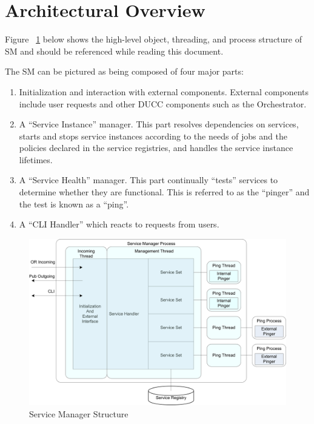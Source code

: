 \section{Architectural Overview}

    Figure ~\ref{fig:sm-structure} below shows the high-level object,
    threading, and process structure of SM and should be referenced
    while reading this document.
    
    The SM can be pictured as being composed of four major parts:
    \begin{enumerate}
      \item Initialization and interaction with external components.
        External components include user requests and  other DUCC components such as
        the Orchestrator.
      \item A ``Service Instance'' manager.  This part resolves
        dependencies on services, starts and stops service instances
        according to the needs of jobs and the policies declared in
        the service registries, and handles the service instance
        lifetimes.
      \item A ``Service Health'' manager.  This part continually
        ``tests'' services to determine whether they are 
        functional.  This is referred to as the ``pinger'' and the
        test is known as a ``ping''.
      \item A ``CLI Handler'' which reacts to requests from users.
    \end{enumerate}

    \begin{figure}[H]
      \centering
      \includegraphics[width=5.5in]{images/ducc-internals/sm-structure.png}
      \caption{Service Manager Structure}
      \label{fig:sm-structure}
    \end{figure}

